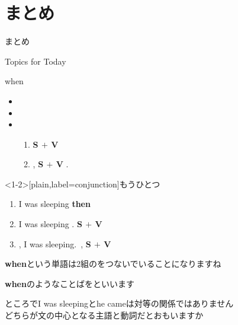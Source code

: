 \documentclass[aspectratio=169,xcolor={dvipsnames,table}]{beamer}
\begin{document}
\section{まとめ}
\begin{frame}[plain]{まとめ}
\begin{block}{Topics for Today}

when 
\begin{itemize}[square]\small
 \item   {}
 \item   {}
 \item   {}
	 \begin{enumerate}
	  \item {\bfseries S $+$ V}\,\,
	  \item {},\,\,{\bfseries S $+$ V}
.	 \end{enumerate}
\end{itemize}
     \end{block}
\end{frame}
\begin{frame}<1-2>[plain,label=conjunction]{もうひとつ}
 
\begin{enumerate}
 \item I was sleeping {\bfseries then}
 \item I was sleeping .%
\hfill{}{\bfseries S $+$ V}\,\,\,
 \item {}, I was sleeping.%
\hfill{}\,,\,\,{\bfseries S $+$ V}
\end{enumerate}

\bigskip

\pause
{\bfseries when}という単語は2組のをつないでいることになりますね

\hfill{}{\bfseries when}のようなことばをといいます


\vfill

\pause
\textdbend ところでI was sleepingとhe cameは対等の関係ではありません\\
\hspace{15pt}どちらが文の中心となる主語と動詞だとおもいますか

\end{frame}
\end{document}
